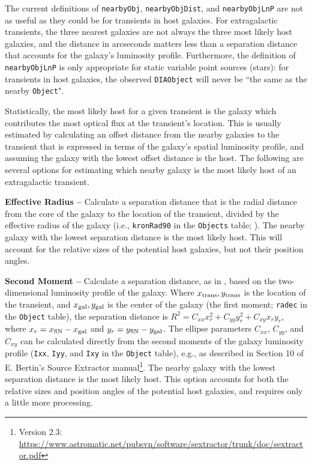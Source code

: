 \documentclass[DM,lsstdraft,authoryear,toc]{lsstdoc}
\begin{document}
The current definitions of {\tt nearbyObj}, {\tt nearbyObjDist}, and {\tt nearbyObjLnP} are not as useful as they could be for transients in host galaxies. 
For extragalactic transients, the three nearest galaxies are not always the three most likely host galaxies, and the distance in arcseconds matters less than a separation distance that accounts for the galaxy's luminosity profile.
Furthermore, the definition of {\tt nearbyObjLnP} is only appropriate for static variable point sources (stars): for transients in host galaxies, the observed {\tt DIAObject} will never be ``the same as the nearby {\tt Object}".

Statistically, the most likely host for a given transient is the galaxy which contributes the most optical flux at the transient's location.
This is usually estimated by calculating an offset distance from the nearby galaxies to the transient that is expressed in terms of the galaxy's spatial luminosity profile, and assuming the galaxy with the lowest offset distance is the host.
The following are several options for estimating which nearby galaxy is the most likely host of an extragalactic transient.

{\bf Effective Radius --} Calculate a separation distance that is the radial distance from the core of the galaxy to the location of the transient, divided by the effective radius of the galaxy (i.e., {\tt kronRad90} in the {\tt Objects} table; ).
The nearby galaxy with the lowest separation distance is the most likely host. This will account for the relative sizes of the potential host galaxies, but not their position angles. 

{\bf Second Moment --} Calculate a separation distance, as in \citet{2006ApJ...648..868S}, based on the two-dimensional luminosity profile of the galaxy.
Where $x_{\rm trans},y_{\rm trans}$ is the location of the transient, and $x_{\rm gal},y_{\rm gal}$ is the center of the galaxy (the first moment; {\tt radec} in the {\tt Object} table), the separation distance is $R^2 = C_{xx} x_r^2 + C_{yy} y_r^2 + C_{xy} x_r y_r$, where $x_r = x_{\rm SN} - x_{\rm gal}$ and $y_r = y_{\rm SN} - y_{\rm gal}$.
The ellipse parameters $C_{xx}$, $C_{yy}$, and $C_{xy}$ can be calculated directly from the second moments of the galaxy luminosity profile ({\tt Ixx}, {\tt Iyy}, and {\tt Ixy} in the {\tt Object} table), e.g., as described in Section 10 of E. Bertin's Source Extractor manual\footnote{Version 2.3: \url{https://www.astromatic.net/pubsvn/software/sextractor/trunk/doc/sextractor.pdf}}.
The nearby galaxy with the lowest separation distance is the most likely host.
This option accounts for both the relative sizes and position angles of the potential host galaxies, and requires only a little more processing. 
\end{document}
